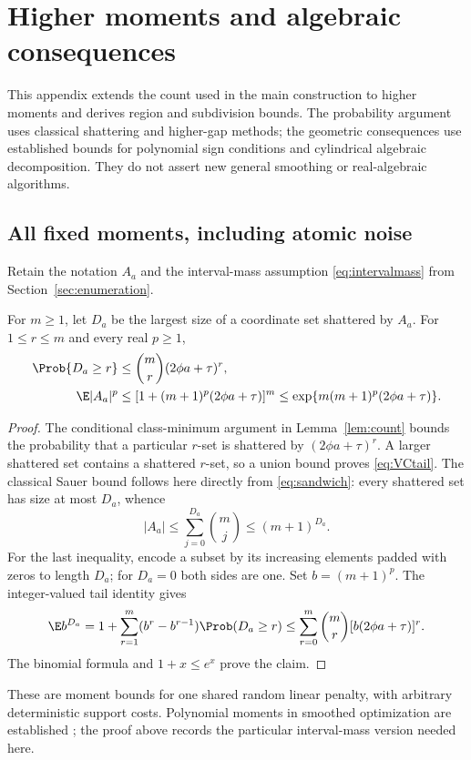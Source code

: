 \section{Higher moments and algebraic consequences}\label{sec:moments}
This appendix extends the count used in the main construction to higher moments
and derives region and subdivision bounds. The probability argument uses classical
shattering and higher-gap methods; the geometric consequences use established
bounds for polynomial sign conditions and cylindrical algebraic decomposition.
They do not assert new general smoothing or real-algebraic algorithms.

\subsection{All fixed moments, including atomic noise}
Retain the notation $A_a$ and the interval-mass assumption
\eqref{eq:intervalmass} from Section~\ref{sec:enumeration}.

\begin{lemma}\label{lem:moments}
For $m\ge1$, let $D_a$ be the largest size of a coordinate set shattered
by $A_a$. For $1\le r\le m$ and every real $p\ge1$,
\begin{align}
 \Prob\{D_a\ge r\}&\le \binom{m}{r}(2\phi a+\tau)^r,
                                                        \label{eq:VCtail}\\
 \E|A_a|^p&\le[1+(m+1)^p(2\phi a+\tau)]^m
 \le\exp\{m(m+1)^p(2\phi a+\tau)\}.\label{eq:allmoments}
\end{align}
\end{lemma}
\begin{proof}
The conditional class-minimum argument in Lemma~\ref{lem:count} bounds
the probability that a particular $r$-set is shattered by
$(2\phi a+\tau)^r$. A larger shattered set contains a shattered $r$-set,
so a union bound proves \eqref{eq:VCtail}. The classical Sauer bound follows
here directly from \eqref{eq:sandwich}: every shattered set has size at
most $D_a$, whence
\[
 |A_a|\le\sum_{j=0}^{D_a}\binom{m}{j}\le(m+1)^{D_a}.
\]
For the last inequality, encode a subset by its increasing elements padded
with zeros to length $D_a$; for $D_a=0$ both sides are one.
Set $b=(m+1)^p$. The integer-valued tail identity gives
\[
 \E b^{D_a}=1+\sum_{r=1}^m(b^r-b^{r-1})\Prob(D_a\ge r)
 \le\sum_{r=0}^m\binom{m}{r}[b(2\phi a+\tau)]^r.
\]
The binomial formula and $1+x\le e^x$ prove the claim.
\end{proof}

These are moment bounds for one shared random linear penalty, with arbitrary
deterministic support costs. Polynomial moments in smoothed optimization
are established \cite{RoglinTeng,BrunschRoglin}; the proof above records the
particular interval-mass version needed here.

